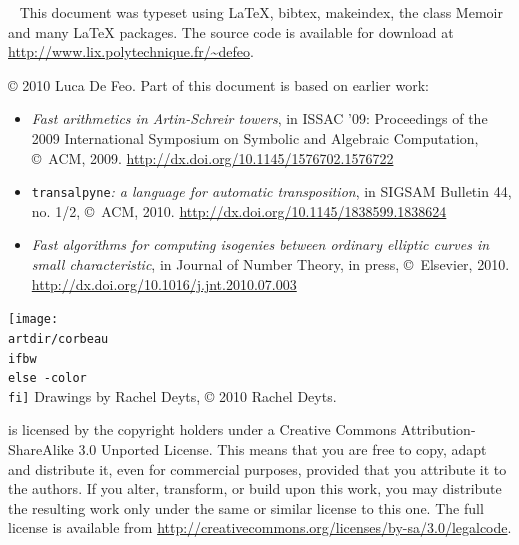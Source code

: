 \begin{titlingpage}
  \clearpage

  ~\vfill
  \footnotesize
  This document was typeset using \LaTeX{}, bibtex, makeindex, the
  class Memoir and many \LaTeX{} packages. The source code is
  available for download at
  \url{http://www.lix.polytechnique.fr/~defeo}.

  \bigskip

  \copyright{} 2010 Luca De Feo.  Part of this document is based on
  earlier work:
  \begin{itemize}
  \item \textit{Fast arithmetics in Artin-Schreir towers}, in ISSAC
    '09: Proceedings of the 2009 International Symposium on Symbolic
    and Algebraic Computation, \copyright{}~ACM,
    2009. \url{http://dx.doi.org/10.1145/1576702.1576722}
  \item \texttt{transalpyne}\textit{: a language for automatic
      transposition}, in SIGSAM Bulletin 44, no. 1/2,
    \copyright{}~ACM,
    2010. \url{http://dx.doi.org/10.1145/1838599.1838624}
  \item \textit{Fast algorithms for computing isogenies between
      ordinary elliptic curves in small characteristic}, in Journal of
    Number Theory, in press, \copyright{}~Elsevier,
    2010. \url{http://dx.doi.org/10.1016/j.jnt.2010.07.003}
  \end{itemize}

  \bigskip

  \ifartwork 
  \texttt{[image: \\artdir/corbeau\\ifbw\\else -color\\fi]}
  Drawings by Rachel Deyts, \copyright{} 2010 Rachel Deyts.
  \bigskip\fi

  \href{http://creativecommons.org/licenses/by-sa/3.0}{}
  \thetitle{} is licensed by the copyright holder\ifartwork s\fi{}
  under a Creative Commons Attribution-ShareAlike 3.0 Unported
  License. This means that you are free to copy, adapt and distribute
  it, even for commercial purposes, provided that you attribute it to
  the author\ifartwork s\fi.  If you alter, transform, or build upon
  this work, you may distribute the resulting work only under the same
  or similar license to this one.  The full license is available from
  \url{http://creativecommons.org/licenses/by-sa/3.0/legalcode}.
\end{titlingpage}

